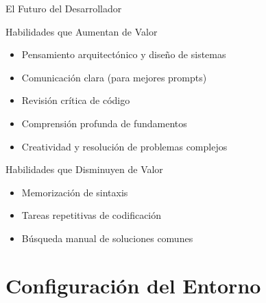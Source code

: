 \documentclass[aspectratio=169]{beamer}
\begin{document}
\begin{frame}{El Futuro del Desarrollador}
    \begin{exampleblock}{Habilidades que Aumentan de Valor}
        \begin{itemize}
            \item Pensamiento arquitectónico y diseño de sistemas
            \item Comunicación clara (para mejores prompts)
            \item Revisión crítica de código
            \item Comprensión profunda de fundamentos
            \item Creatividad y resolución de problemas complejos
        \end{itemize}
    \end{exampleblock}
    
    \vspace{0.3cm}
    \begin{alertblock}{Habilidades que Disminuyen de Valor}
        \begin{itemize}
            \item Memorización de sintaxis
            \item Tareas repetitivas de codificación
            \item Búsqueda manual de soluciones comunes
        \end{itemize}
    \end{alertblock}
\end{frame}

\section{Configuración del Entorno}
\end{document}
